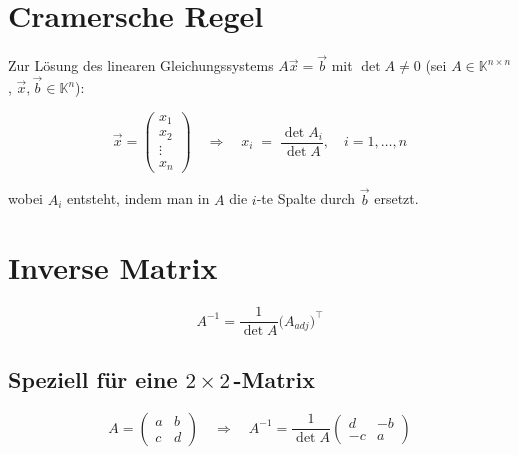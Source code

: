 \documentclass[a4paper,11pt,oneside,open=any,parskip=half, DIV=15]{scrreprt}
\begin{document}
\section{Cramersche Regel}

   Zur Lösung des linearen Gleichungssystems \(A \vec{x} = \vec{b}\) mit \(\det A \neq 0\) (sei \(A\in\mathbb{K}^{n\times n}\), \(\vec{x},\vec{b} \in\mathbb{K}^n\)):

   \begin{importantbox}
      \[
         \vec{x} = \begin{pmatrix}x_1\\ x_2\\ \vdots\\ x_n\end{pmatrix} \quad \Rightarrow \quad x_i \;=\; \frac{\det A_i}{\det A}, \quad i=1,\dots,n
      \]
   \end{importantbox}

   wobei \(A_i\) entsteht, indem man in \(A\) die \(i\)-te Spalte durch \(\vec{b}\) ersetzt.

\section{Inverse Matrix}

   \begin{importantbox}
   \[
      A^{-1} = \frac{1}{\det A} \big( A_{adj} \big)^{\top}
   \]
   \end{importantbox}

   \subsection*{Speziell für eine \texorpdfstring{\(2\times 2\)\,-Matrix}{2x2-Matrix}}

      \begin{importantbox}
      \[
            A = 
               \begin{pmatrix}
                  a & b \\
                  c & d 
               \end{pmatrix} \quad \Rightarrow \quad A^{-1} = \frac{1}{\det A} \begin{pmatrix} d & -b \\ -c & a \end{pmatrix}
      \]
      \end{importantbox}
\end{document}
